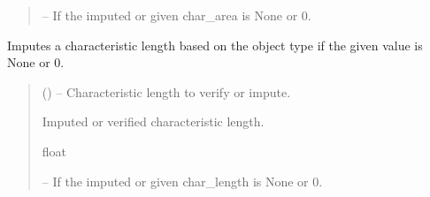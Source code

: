 \documentclass[letterpaper,10pt,english]{sphinxmanual}
\begin{document}
\begin{fulllineitems}
\begin{fulllineitems}
\begin{quote}
\begin{description}
\sphinxAtStartPar
{} – If the imputed or given char\_area is None or 0.

\end{description}\end{quote}

\end{fulllineitems}


\begin{fulllineitems}
\label{\detokenize{fspsim.utils:fspsim.utils.SpaceObject.SpaceObject.impute_char_length}}
\pysigstartsignatures
{}
\pysigstopsignatures
\sphinxAtStartPar
Imputes a characteristic length based on the object type if the given value is None or 0.
\begin{quote}\begin{description}
\sphinxAtStartPar
{} () – Characteristic length to verify or impute.

\sphinxAtStartPar
Imputed or verified characteristic length.

\sphinxAtStartPar
float

\sphinxAtStartPar
{} – If the imputed or given char\_length is None or 0.

\end{description}\end{quote}

\end{fulllineitems}



\end{fulllineitems}
\end{document}
